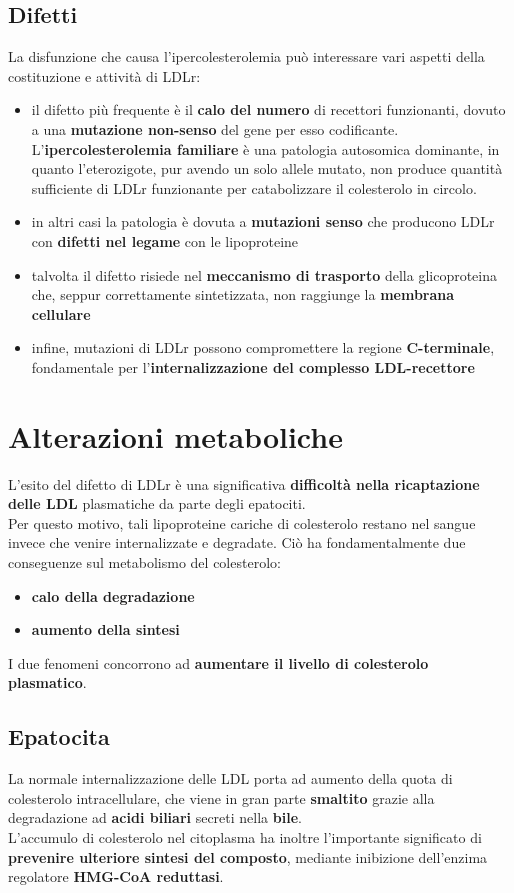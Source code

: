 \documentclass[a4paper, 12pt]{article}
\begin{document}
\begin{titlepage}
\subsection{Difetti}
La disfunzione che causa l'ipercolesterolemia può interessare vari aspetti della costituzione e attività di LDLr:
\begin{itemize}
\item il difetto più frequente è il \textbf{calo del numero} di recettori funzionanti, dovuto a una \textbf{mutazione non-senso} del gene per esso codificante. L'\textbf{ipercolesterolemia familiare} è una patologia autosomica dominante, in quanto l'eterozigote, pur avendo un solo allele mutato, non produce quantità sufficiente di LDLr funzionante per catabolizzare il colesterolo in circolo.
\item in altri casi la patologia è dovuta a \textbf{mutazioni senso} che producono LDLr con \textbf{difetti nel legame} con le lipoproteine
\item talvolta il difetto risiede nel \textbf{meccanismo di trasporto} della glicoproteina che, seppur correttamente sintetizzata, non raggiunge la \textbf{membrana cellulare}
\item infine, mutazioni di LDLr possono compromettere la regione \textbf{C-terminale}, fondamentale per l'\textbf{internalizzazione del complesso LDL-recettore}
\end{itemize}

\section{Alterazioni metaboliche}
L'esito del difetto di LDLr è una significativa \textbf{difficoltà nella ricaptazione delle LDL} plasmatiche da parte degli epatociti.\\
Per questo motivo, tali lipoproteine cariche di colesterolo restano nel sangue invece che venire internalizzate e degradate. Ciò ha fondamentalmente due conseguenze sul metabolismo del colesterolo:
\begin{itemize}
\item \textbf{calo della degradazione}
\item \textbf{aumento della sintesi}
\end{itemize}
I due fenomeni concorrono ad \textbf{aumentare il livello di colesterolo plasmatico}.

\subsection{Epatocita}
La normale internalizzazione delle LDL porta ad aumento della quota di colesterolo intracellulare, che viene in gran parte \textbf{smaltito} grazie alla degradazione ad \textbf{acidi biliari} secreti nella \textbf{bile}.\\
L'accumulo di colesterolo nel citoplasma ha inoltre l'importante significato di \textbf{prevenire ulteriore sintesi del composto}, mediante inibizione dell'enzima regolatore \textbf{HMG-CoA reduttasi}.


\end{titlepage}
\end{document}
